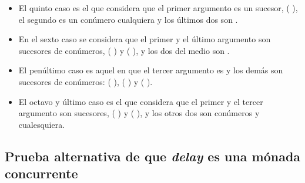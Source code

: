 \begin{AgdaAlign}
\begin{itemize}
\item El quinto caso es el que considera que el primer argumento es un sucesor, ( ), el segundo es un conúmero cualquiera  y los últimos dos son .
\end{itemize}

\begin{itemize}
\item En el sexto caso se considera que el primer y el último argumento son sucesores de conúmeros, ( ) y ( ), y los dos del medio son .
\end{itemize}

\begin{itemize}
\item El penúltimo caso es aquel en que el tercer argumento es  y los demás son sucesores de conúmeros: ( ), ( ) y ( ).
\end{itemize}

\begin{itemize}
\item El octavo y último caso es el que considera que el primer y el tercer argumento son sucesores, ( ) y ( ), y los otros dos son conúmeros  y  cualesquiera.
\end{itemize}

\end{AgdaAlign}


\subsection{Prueba alternativa de que \textit{delay} es una mónada concurrente}

